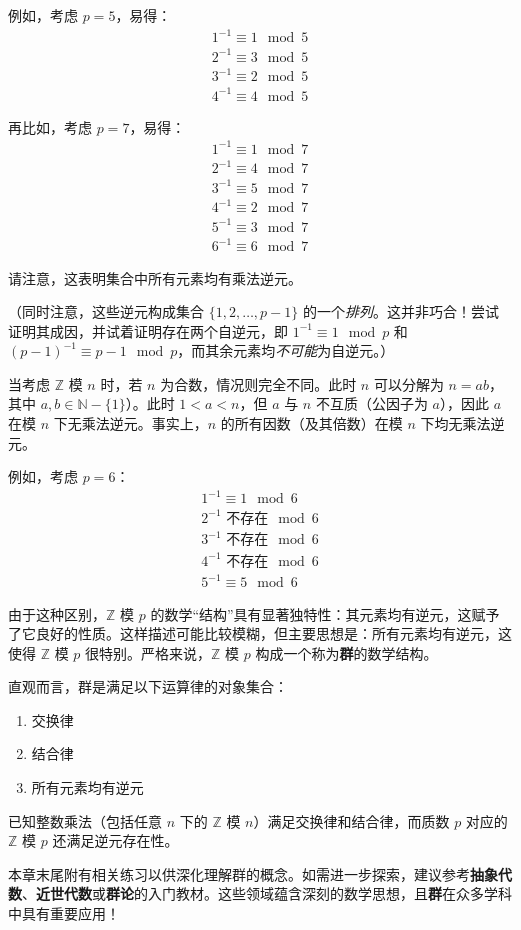 例如，考虑 $p=5$，易得：
\begin{align*}
    1^{-1} \equiv 1 \mod 5\\
    2^{-1} \equiv 3 \mod 5\\
    3^{-1} \equiv 2 \mod 5\\
    4^{-1} \equiv 4 \mod 5
\end{align*}

再比如，考虑 $p=7$，易得：
\begin{align*}
    1^{-1} \equiv 1 \mod 7\\
    2^{-1} \equiv 4 \mod 7\\
    3^{-1} \equiv 5 \mod 7\\
    4^{-1} \equiv 2 \mod 7\\
    5^{-1} \equiv 3 \mod 7\\
    6^{-1} \equiv 6 \mod 7
\end{align*}

请注意，这表明集合中所有元素均有乘法逆元。

（同时注意，这些逆元构成集合 $\{1, 2, \dots, p-1\}$ 的一个\emph{排列}。这并非巧合！尝试证明其成因，并试着证明存在两个自逆元，即 $1^{-1} \equiv 1 \mod p$ 和 $(p - 1)^{-1} \equiv p - 1 \mod p$，而其余元素均\emph{不可能}为自逆元。）

当考虑 $\mathbb{Z}$ 模 $n$ 时，若 $n$ 为合数，情况则完全不同。此时 $n$ 可以分解为 $n = ab$，其中 $a,b \in \mathbb{N}-\{1\}$）。此时 $1 < a < n$，但 $a$ 与 $n$ 不互质（公因子为 $a$），因此 $a$ 在模 $n$ 下无乘法逆元。事实上，$n$ 的所有因数（及其倍数）在模 $n$ 下均无乘法逆元。

例如，考虑 $p=6$：
\begin{align*}
    1^{-1} \equiv 1 \mod 6\\
    2^{-1} \text{\ 不存在} \mod 6\\
    3^{-1} \text{\ 不存在} \mod 6\\
    4^{-1} \text{\ 不存在} \mod 6\\
    5^{-1} \equiv 5 \mod 6
\end{align*}

由于这种区别，$\mathbb{Z}$ 模 $p$ 的数学``结构''具有显著独特性：其元素均有逆元，这赋予了它良好的性质。这样描述可能比较模糊，但主要思想是：所有元素均有逆元，这使得 $\mathbb{Z}$ 模 $p$ 很特别。严格来说，$\mathbb{Z}$ 模 $p$ 构成一个称为\textbf{群}的数学结构。

直观而言，群是满足以下运算律的对象集合：
\begin{enumerate}[label=(\alph*)]
    \item 交换律
    \item 结合律
    \item 所有元素均有逆元
\end{enumerate}

已知整数乘法（包括任意 $n$ 下的 $\mathbb{Z}$ 模 $n$）满足交换律和结合律，而质数 $p$ 对应的 $\mathbb{Z}$ 模 $p$ 还满足逆元存在性。

本章末尾附有相关练习以供深化理解群的概念。如需进一步探索，建议参考\textbf{抽象代数}、\textbf{近世代数}或\textbf{群论}的入门教材。这些领域蕴含深刻的数学思想，且\textbf{群}在众多学科中具有重要应用！
